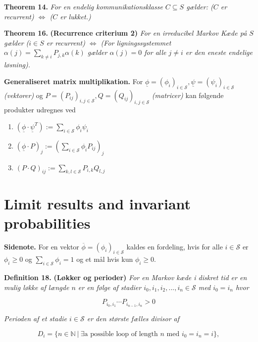 \documentclass[a4paper,12pt,openany]{book}
\providecommand{\tightlist}{%
 \setlength{\itemsep}{0pt}\setlength{\parskip}{0pt}}
\begin{document}
\textbf{Theorem 14.} \emph{For en endelig kommunikationsklasse \(C\subseteq S\) gælder: (\(C\) er recurrent) \(\Leftrightarrow\) (\(C\) er lukket.)}

\textbf{Theorem 16.} \textbf{(Recurrence criterium 2)} \emph{For en irreducibel Markov Kæde på \(S\) gælder (\(i\in S\) er recurrent) \(\Leftrightarrow\) (For ligningssystemmet \(\alpha(j)=\sum_{k\ne i}P_{j,k}\alpha(k)\) gælder \(\alpha(j)=0\) for alle \(j\ne i\) er den eneste endelige løsning).}

\textbf{Generaliseret matrix multiplikation.} For \(\underline{\phi}=(\phi_i)_{i\in\mathcal{S}},\underline{\psi}=(\psi_i)_{i\in\mathcal{S}}\) \emph{(vektorer)} og \(P=(P_{ij})_{i,j\in\mathcal{S}},Q=(Q_{ij})_{i,j\in\mathcal{S}}\) \emph{(matricer)} kan følgende produkter udregnes ved

\begin{enumerate}
\def\labelenumi{\roman{enumi}.}
\tightlist
\item
  \((\underline{\phi}\cdot \underline{\psi}^T):=\sum_{i\in\mathcal{S}}\phi_i\psi_i\)
\item
  \((\underline{\phi}\cdot P)_j:=\left(\sum_{i\in\mathcal{S}}\phi_i P_{ij}\right)_j\)
\item
  \((P\cdot Q)_{ij}:=\sum_{k,l\in\mathcal{S}}P_{i,k}Q_{l,j}\)
\end{enumerate}

\hypertarget{limit-results-and-invariant-probabilities}{%
\section{Limit results and invariant probabilities}\label{limit-results-and-invariant-probabilities}}

\textbf{Sidenote.} For en vektor \(\overline{\phi}=(\phi_i)_{i\in \mathcal{S}}\) kaldes en fordeling, hvis for alle \(i\in\mathcal{S}\) er \(\phi_i\ge0\) og \(\sum_{i\in\mathcal{S}}\phi_i=1\) og et mål hvis kun \(\phi_i\ge 0\).

\textbf{Definition 18.} \textbf{(Løkker og perioder)} \emph{For en Markov kæde i diskret tid er en mulig løkke af længde \(n\) er en følge af stadier \(i_0,i_1,i_2,...,i_n\in\mathcal{S}\) med \(i_0=i_n\) hvor}

\[
P_{i_0,i_1}\cdots P_{i_{n-1},i_n}>0
\]

\emph{Perioden af et stadie \(i\in\mathcal{S}\) er den største fælles divisor af}

\[
D_i=\{n\in\mathbb{N}\ \vert\ \exists \text{a possible loop of length $n$ med $i_0=i_n=i$}\},
\]
\end{document}
